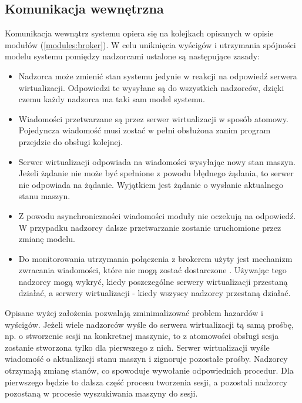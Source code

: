 \documentclass[../opis-rozwiazania.tex]{subfiles}
\begin{document}
\label{communication}

\subsection{Komunikacja wewnętrzna}
\label{communication:broker}

Komunikacja wewnątrz systemu opiera się na kolejkach opisanych w opisie modułów (\ref{modules:broker}). W celu uniknięcia wyścigów i utrzymania spójności modelu systemu pomiędzy nadzorcami ustalone są następujące zasady:
\begin{itemize}
  \item Nadzorca może zmienić stan systemu jedynie w reakcji na odpowiedź serwera wirtualizacji. Odpowiedzi te wysyłane są do wszystkich nadzorców, dzięki czemu każdy nadzorca ma taki sam model systemu.
  \item Wiadomości przetwarzane są przez serwer wirtualizacji w sposób atomowy. Pojedyncza wiadomość musi zostać w pełni obsłużona zanim program przejdzie do obsługi kolejnej.
  \item Serwer wirtualizacji odpowiada na wiadomości wysyłając nowy stan maszyn. Jeżeli żądanie nie może być spełnione z powodu błędnego żądania, to serwer nie odpowiada na żądanie. Wyjątkiem jest żądanie o wysłanie aktualnego stanu maszyn.
  \item Z powodu asynchroniczności wiadomości moduły nie oczekują na odpowiedź. W przypadku nadzorcy dalsze przetwarzanie zostanie uruchomione przez zmianę modelu.
  \item Do monitorowania utrzymania połączenia z brokerem użyty jest mechanizm zwracania wiadomości, które nie mogą zostać dostarczone \parencite{rabbit-unroutable}. Używając tego nadzorcy mogą wykryć, kiedy poszczególne serwery wirtualizacji przestaną działać, a serwery wirtualizacji - kiedy wszyscy nadzorcy przestaną działać.
\end{itemize}

Opisane wyżej założenia pozwalają zminimalizować problem hazardów i wyścigów. Jeżeli wiele nadzorców wyśle do serwera wirtualizacji tą samą prośbę, np. o stworzenie sesji na konkretnej maszynie, to z atomowości obsługi sesja zostanie stworzona tylko dla pierwszego z nich. Serwer wirtualizacji wyśle wiadomość o aktualizacji stanu maszyn i zignoruje pozostałe prośby. Nadzorcy otrzymają zmianę stanów, co spowoduje wywołanie odpowiednich procedur. Dla pierwszego będzie to dalsza część procesu tworzenia sesji, a pozostali nadzorcy pozostaną w procesie wyszukiwania maszyny do sesji.
\end{document}
